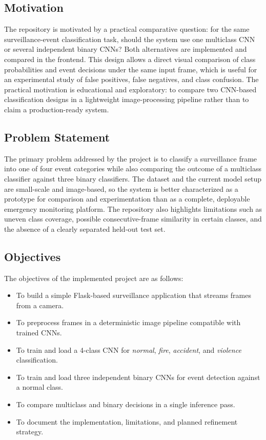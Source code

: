 \documentclass[11pt,a4paper]{article}
\begin{document}
\subsection{Motivation}
The repository is motivated by a practical comparative question: for the same surveillance-event classification task, should the system use one multiclass CNN or several independent binary CNNs? Both alternatives are implemented and compared in the frontend. This design allows a direct visual comparison of class probabilities and event decisions under the same input frame, which is useful for an experimental study of false positives, false negatives, and class confusion. The practical motivation is educational and exploratory: to compare two CNN-based classification designs in a lightweight image-processing pipeline rather than to claim a production-ready system.

\subsection{Problem Statement}
The primary problem addressed by the project is to classify a surveillance frame into one of four event categories while also comparing the outcome of a multiclass classifier against three binary classifiers. The dataset and the current model setup are small-scale and image-based, so the system is better characterized as a prototype for comparison and experimentation than as a complete, deployable emergency monitoring platform. The repository also highlights limitations such as uneven class coverage, possible consecutive-frame similarity in certain classes, and the absence of a clearly separated held-out test set.

\subsection{Objectives}
The objectives of the implemented project are as follows:
\begin{itemize}[leftmargin=1.5em]
    \item To build a simple Flask-based surveillance application that streams frames from a camera.
    \item To preprocess frames in a deterministic image pipeline compatible with trained CNNs.
    \item To train and load a 4-class CNN for \emph{normal}, \emph{fire}, \emph{accident}, and \emph{violence} classification.
    \item To train and load three independent binary CNNs for event detection against a normal class.
    \item To compare multiclass and binary decisions in a single inference pass.
    \item To document the implementation, limitations, and planned refinement strategy.
\end{itemize}
\end{document}
